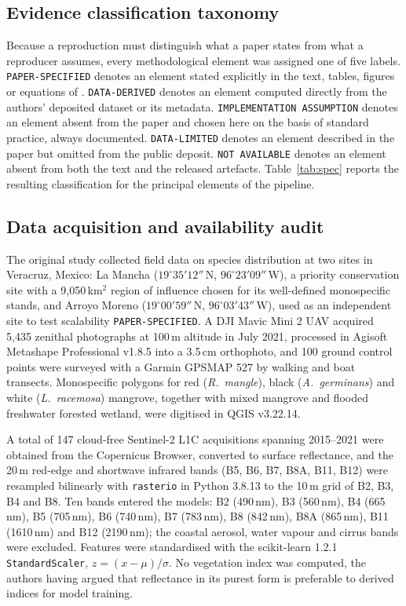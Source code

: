 \documentclass[10pt,twocolumn,a4paper]{article}
\newcommand{\evc}[1]{{\footnotesize\texttt{#1}}}
\begin{document}
\subsection{Evidence classification taxonomy}
\label{sec:taxonomy}

Because a reproduction must distinguish what a paper states from what a reproducer assumes, every
methodological element was assigned one of five labels. \evc{PAPER-SPECIFIED} denotes an element
stated explicitly in the text, tables, figures or equations of \citet{monterrubio2025}.
\evc{DATA-DERIVED} denotes an element computed directly from the authors' deposited dataset or its
metadata. \evc{IMPLEMENTATION ASSUMPTION} denotes an element absent from the paper and chosen here
on the basis of standard practice, always documented. \evc{DATA-LIMITED} denotes an element
described in the paper but omitted from the public deposit. \evc{NOT AVAILABLE} denotes an element
absent from both the text and the released artefacts. Table~\ref{tab:spec} reports the resulting
classification for the principal elements of the pipeline.

\subsection{Data acquisition and availability audit}
\label{sec:dataaudit}

The original study collected field data on species distribution at two sites in Veracruz, Mexico:
La Mancha ($19^{\circ}35'12''$\,N, $96^{\circ}23'09''$\,W), a priority conservation site with a
9{,}050\,km$^2$ region of influence chosen for its well-defined monospecific stands, and Arroyo
Moreno ($19^{\circ}00'59''$\,N, $96^{\circ}03'43''$\,W), used as an independent site to test
scalability \evc{PAPER-SPECIFIED}. A DJI Mavic Mini 2 UAV acquired 5{,}435 zenithal photographs at
100\,m altitude in July 2021, processed in Agisoft Metashape Professional v1.8.5 into a 3.5\,cm
orthophoto, and 100 ground control points were surveyed with a Garmin GPSMAP 527 by walking and
boat transects. Monospecific polygons for red (\emph{R.\ mangle}), black (\emph{A.\ germinans}) and
white (\emph{L.\ racemosa}) mangrove, together with mixed mangrove and flooded freshwater forested
wetland, were digitised in QGIS v3.22.14.

A total of 147 cloud-free Sentinel-2 L1C acquisitions spanning 2015--2021 were obtained from the
Copernicus Browser, converted to surface reflectance, and the 20\,m red-edge and shortwave infrared
bands (B5, B6, B7, B8A, B11, B12) were resampled bilinearly with \texttt{rasterio} in Python 3.8.13
to the 10\,m grid of B2, B3, B4 and B8. Ten bands entered the models: B2 (490\,nm), B3 (560\,nm),
B4 (665\,nm), B5 (705\,nm), B6 (740\,nm), B7 (783\,nm), B8 (842\,nm), B8A (865\,nm), B11
(1610\,nm) and B12 (2190\,nm); the coastal aerosol, water vapour and cirrus bands were excluded.
Features were standardised with the scikit-learn 1.2.1 \texttt{StandardScaler}, $z=(x-\mu)/\sigma$.
No vegetation index was computed, the authors having argued that reflectance in its purest form is
preferable to derived indices for model training.
\end{document}
